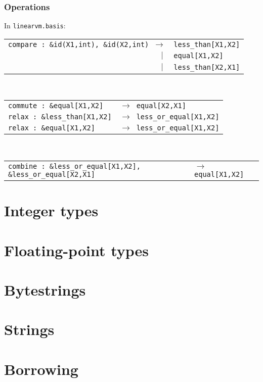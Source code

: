 \documentclass[a4paper]{book}
\begin{document}
\subsection*{Operations}

In \texttt{linearvm.basis}:\\
\begin{tabular}{r@{}l}
\texttt{compare : \&id(X1,int), \&id(X2,int) $\to$}
& \texttt{less\_than[X1,X2]}\\
$|\;$ & \texttt{equal[X1,X2]}\\
$|\;$ & \texttt{less\_than[X2,X1]}\\
\end{tabular}
\\
\begin{tabular}{l@{}l}
\texttt{commute : \&equal[X1,X2]} & \texttt{$\to$ equal[X2,X1]}\\
\texttt{relax : \&less\_than[X1,X2]} & \texttt{$\to$ less\_or\_equal[X1,X2]}\\
\texttt{relax : \&equal[X1,X2]} & \texttt{$\to$ less\_or\_equal[X1,X2]}\\
\end{tabular}
\\
\begin{tabular}{l@{}l}
\texttt{combine : \&less\_or\_equal[X1,X2], \&less\_or\_equal[X2,X1]}
& \texttt{$\to$ equal[X1,X2]}\\
\end{tabular}

\chapter{Integer types}
\chapter{Floating-point types}
\chapter{Bytestrings}





\chapter{Strings}
\chapter{Borrowing}
\end{document}
